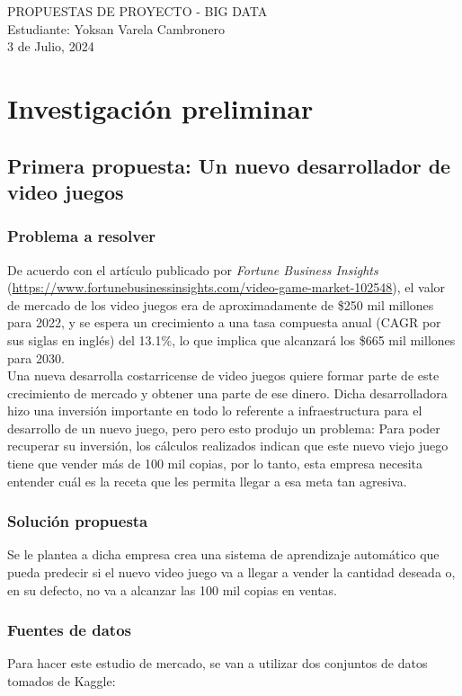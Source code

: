 \documentclass[a4paper]{article}
\begin{document}
\begin{center}
\large{PROPUESTAS DE PROYECTO - BIG DATA}\\
\small{Estudiante: Yoksan Varela Cambronero}\\
\small{3 de Julio, 2024}
\end{center}

\section{Investigación preliminar}

\subsection{Primera propuesta: Un nuevo desarrollador de video juegos}
\subsubsection{Problema a resolver}
De acuerdo con el artículo publicado por \textit{Fortune Business Insights} (\url{https://www.fortunebusinessinsights.com/video-game-market-102548}), el valor de mercado de los video juegos era de aproximadamente de \$250 mil millones para 2022, y se espera un crecimiento a una tasa compuesta anual (CAGR por sus siglas en inglés) del 13.1\%, lo que implica que alcanzar\'{a} los \$665 mil millones para 2030.\\

Una nueva desarrolla costarricense de video juegos quiere formar parte de este crecimiento de mercado y obtener una parte de ese dinero. Dicha desarrolladora hizo una inversión importante en todo lo referente a infraestructura para el desarrollo de un nuevo juego, pero pero esto produjo un problema: Para poder recuperar su inversión, los cálculos realizados indican que este nuevo viejo juego tiene que vender m\'{a}s de 100 mil copias, por lo tanto, esta empresa necesita entender cuál es la receta que les permita llegar a esa meta tan agresiva.

\subsubsection{Solución propuesta}
Se le plantea a dicha empresa crea una sistema de aprendizaje automático que pueda predecir si el nuevo video juego va a llegar a vender la cantidad deseada o, en su defecto, no va a alcanzar las 100 mil copias en ventas.

\subsubsection{Fuentes de datos}
Para hacer este estudio de mercado, se van a utilizar dos conjuntos de datos tomados de Kaggle:
\end{document}
